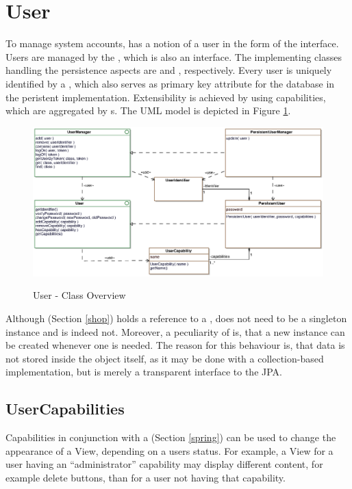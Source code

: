\section{User}
To manage system accounts, \salespoint{} has a notion of a user in the form of the  interface.
Users are managed by the , which is also an interface.
The implementing classes handling the persistence aspects are  and , respectively.
Every user is uniquely identified by a , which also serves as primary key attribute for the database in the peristent implementation.
Extensibility is achieved by using capabilities, which are aggregated by s.
The UML model is depicted in Figure \ref{user_overview}.\\

\begin{figure}
	\centering
  \includegraphics[width=1.0\textwidth]{images/User_Overview.eps}
	\label{user_overview}
	\caption{User - Class Overview}
\end{figure}

Although  (Section \ref{shop}) holds a reference to a ,  does not need to be a singleton instance and is indeed not.
Moreover, a peculiarity of  is, that a new instance can be created whenever one is needed.
The reason for this behaviour is, that data is not stored inside the  object itself, as it may be done with a collection-based implementation, but  is merely a transparent interface to the JPA.\\

\subsection*{UserCapabilities}
Capabilities in conjunction with a  (Section \ref{spring}) can be used to change the appearance of a View, depending on a users status.
For example, a View for a user having an ``administrator'' capability may display different content, for example delete buttons, than for a user not having that capability.

